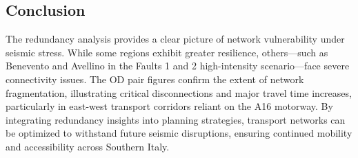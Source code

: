 \subsection{ Conclusion}
The redundancy analysis provides a clear picture of network vulnerability under seismic stress. While some regions exhibit greater resilience, others—such as Benevento and Avellino in the Faults 1 and 2 high-intensity scenario—face severe connectivity issues. The OD pair figures confirm the extent of network fragmentation, illustrating critical disconnections and major travel time increases, particularly in east-west transport corridors reliant on the A16 motorway.  By integrating redundancy insights into planning strategies, transport networks can be optimized to withstand future seismic disruptions, ensuring continued mobility and accessibility across Southern Italy.
